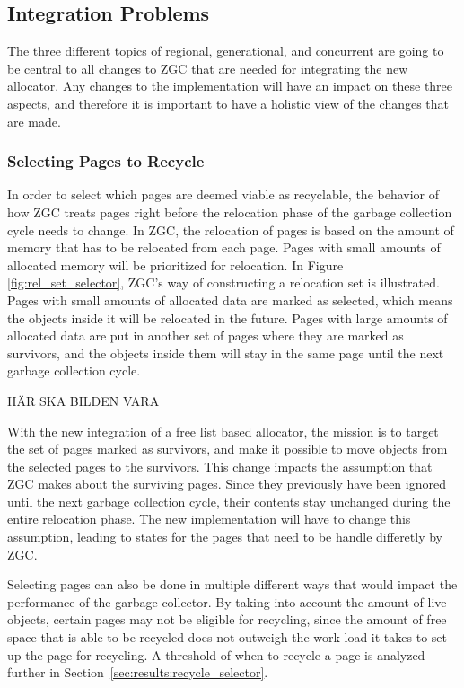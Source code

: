 \subsection{Integration Problems}
The three different topics of regional, generational, and concurrent are going to be central to all changes to ZGC that are needed for integrating the new allocator. Any changes to the implementation will have an impact on these three aspects, and therefore it is important to have a holistic view of the changes that are made.
\subsubsection{Selecting Pages to Recycle}
In order to select which pages are deemed viable as recyclable, the behavior of how ZGC treats pages right before the relocation phase of the garbage collection cycle needs to change. In ZGC, the relocation of pages is based on the amount of memory that has to be relocated from each page. Pages with small amounts of allocated memory will be prioritized for relocation. In Figure \ref{fig:rel_set_selector}, ZGC's way of constructing a relocation set is illustrated. Pages with small amounts of allocated data are marked as selected, which means the objects inside it will be relocated in the future. Pages with large amounts of allocated data are put in another set of pages where they are marked as survivors, and the objects inside them will stay in the same page until the next garbage collection cycle. 

HÄR SKA BILDEN VARA

With the new integration of a free list based allocator, the mission is to target the set of pages marked as survivors, and make it possible to move objects from the selected pages to the survivors. This change impacts the assumption that ZGC makes about the surviving pages. Since they previously have been ignored until the next garbage collection cycle, their contents stay unchanged during the entire relocation phase. The new implementation will have to change this assumption, leading to states for the pages that need to be handle differetly by ZGC.

Selecting pages can also be done in multiple different ways that would impact the performance of the garbage collector. By taking into account the amount of live objects, certain pages may not be eligible for recycling, since the amount of free space that is able to be recycled does not outweigh the work load it takes to set up the page for recycling. A threshold of when to recycle a page is analyzed further in Section~\ref{sec:results:recycle_selector}.

